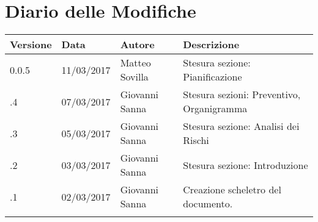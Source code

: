 \section*{Diario delle Modifiche}
\begin{longtabu} to \textwidth {
	X[4,l,p]
	X[4,l,p]
	X[4,l,p]
	X[8,l,p]}
	\toprule
		 Versione & Data & Autore & Descrizione \\
		\midrule
		\endhead
		
		0.0.5 & 11/03/2017 & Matteo Sovilla & Stesura sezione: Pianificazione\\
		\addlinespace[0.2em]
		\midrule
		.4 & 07/03/2017 & Giovanni Sanna & Stesura sezioni: Preventivo, Organigramma\\
		\addlinespace[0.2em]
		\midrule
		.3 & 05/03/2017 & Giovanni Sanna & Stesura sezione: Analisi dei Rischi \\
		\addlinespace[0.2em]
		\midrule
		.2 & 03/03/2017 & Giovanni Sanna & Stesura sezione: Introduzione \\
		\addlinespace[0.2em]
		\midrule
		.1 & 02/03/2017 & Giovanni Sanna & Creazione scheletro del documento. \\
		\addlinespace[0.4em]
		
	\bottomrule
\end{longtabu}